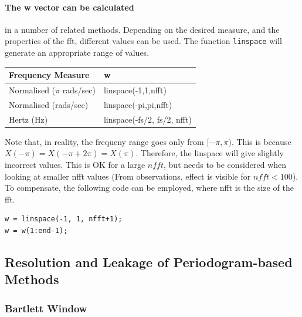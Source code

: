 \documentclass[main.tex]{subfiles}
\begin{document}
\paragraph{The w vector can be calculated } in a number of related methods. Depending on the desired measure, and the properties of the fft, different values can be used. The function {\tt linspace} will generate an appropriate range of values. 

\begin{table}[h]
	\centering
	\begin{tabular}{|l|l|}
		\hline
		\textbf{Frequency Measure} & \textbf{w}                  \\ \hline
		Normalised ($\pi$ rads/sec)  & linspace(-1,1,nfft)         \\ \hline
		Normalised (rads/sec)      & linspace(-pi,pi,nfft)       \\ \hline
		Hertz (Hz)                 & linspace(-fs/2, fs/2, nfft) \\ \hline
	\end{tabular}
\end{table}

Note that, in reality, the frequeny range goes only from $[-\pi,\pi)$. This is because $X(-\pi) = X(-\pi+2\pi) = X(\pi)$. Therefore, the linspace will give slightly incorrect values. This is OK for a large $nfft$, but needs to be considered when looking at smaller nfft values (From observations, effect is visible for $nfft < 100$). To compensate, the following code can be employed, where nfft is the size of the fft.

\begin{lstlisting}[frame=single]
w = linspace(-1, 1, nfft+1);
w = w(1:end-1);
\end{lstlisting}





















\subsection{Resolution and Leakage of Periodogram-based Methods}


\subsubsection{Bartlett Window}
\end{document}
